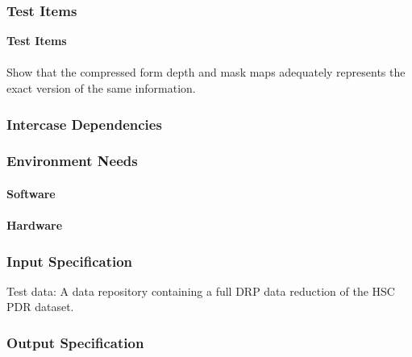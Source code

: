 \subsubsection{Test Items}
\textbf{Test Items}\\
~\\
Show that the compressed form depth and mask maps adequately represents
the exact version of the same information.



\subsubsection{Intercase Dependencies}

\subsubsection{Environment Needs}

\paragraph{Software}

\paragraph{Hardware}

\subsubsection{Input Specification}
Test data: A data repository containing a full DRP data reduction of the
HSC PDR dataset.


\subsubsection{Output Specification}

